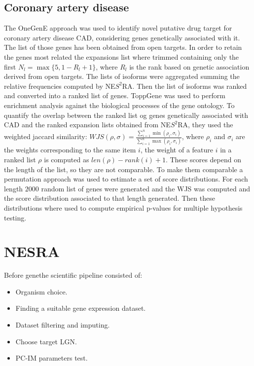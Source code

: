 	\subsection{Coronary artery disease}
	The OneGenE approach was used to identify novel putative drug target for coronary artery disease CAD, considering genes genetically associated with it.
	The list of those genes has been obtained from open targets.
	In order to retain the genes most related the expansions list where trimmed containing only the first $N_l=\max\{5, 1-R_l+1\}$, where $R_l$ is the rank based on genetic association derived from open targets.
	The lists of isoforms were aggregated summing the relative frequencies computed by NE$S^2$RA.
	Then the list of isoforms was ranked and converted into a ranked list of genes.
	ToppGene was used to perform enrichment analysis against the biological processes of the gene ontology.
	To quantify the overlap between the ranked list og genes genetically associated with CAD and the ranked expansion lists obtained from NE$S^2$RA, they used the weighted jaccard similarity: $WJS(\rho, \sigma) = \frac{\sum\limits_{i=1}^n\min(\rho_i, \sigma_i)}{\sum\limits_{i=1}^n\max(\rho_i, \sigma_i)}$, where $\rho_i$ and $\sigma_i$ are the weights corresponding to the same item $i$, the weight of a feature $i$ in a ranked list $\rho$ is computed as $len(\rho)-rank(i)+1$.
	These scores depend on the length of the list, so they are not comparable.
	To make them comparable a permutation approach was used to estimate a set of score distributions.
	For each length $2000$ random list of genes were generated and the WJS was computed and the score distribution associated to that length generated.
	Then these distributions where used to compute empirical p-values for multiple hypothesis testing.

\section{NESRA}
Before gene\@home the scientific pipeline consisted of:

\begin{multicols}{2}
	\begin{itemize}
		\item Organism choice.
		\item Finding a suitable gene expression dataset.
		\item Dataset filtering and imputing.
		\item Choose target LGN.
		\item PC-IM parameters test.
	\end{itemize}
\end{multicols}

